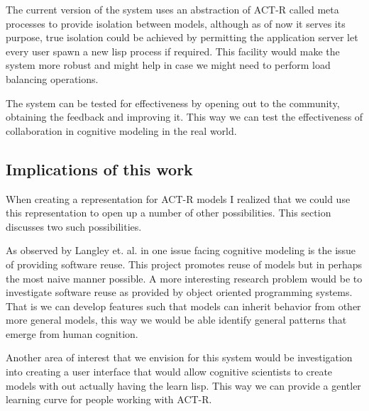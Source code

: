 The current version of the system uses an abstraction of ACT-R called
meta processes to provide isolation between models, although as of now
it serves its purpose, true isolation could be achieved by permitting
the application server let every user spawn a new lisp process if
required. This facility would make the system more robust and might
help in case we might need to perform load balancing operations.

The system can be tested for effectiveness by opening out to the
community, obtaining the feedback and improving it. This way we can
test the effectiveness of collaboration in cognitive modeling in the
real world.


\subsection{Implications of this work}

When creating a representation for ACT-R models I realized that we
could use this representation to open up a number of other
possibilities. This section discusses two such possibilities.

As observed by Langley et. al. in \cite{citeulike:4182324} one issue
facing cognitive modeling is the issue of providing software
reuse. This project promotes reuse of models but in perhaps the most
naive manner possible. A more interesting research problem would be to
investigate software reuse as provided by object oriented programming
systems. That is we can develop features such that models can inherit
behavior from other more general models, this way we would be able
identify general patterns that emerge from human cognition.

Another area of interest that we envision for this system would be
investigation into creating a user interface that would allow
cognitive scientists to create models with out actually having the
learn lisp. This way we can provide a gentler learning curve for
people working with ACT-R.

